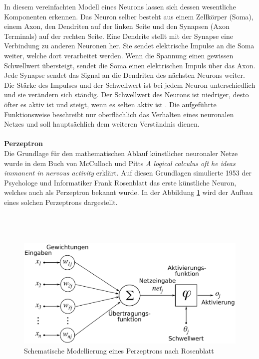 In diesem vereinfachten Modell eines Neurons lassen sich dessen wesentliche Komponenten erkennen. Das Neuron selber besteht aus einem Zellkörper (Soma), einem Axon, den Dendriten auf der linken Seite und den Synapsen (Axon Terminals) auf der rechten Seite. Eine Dendrite stellt mit der Synapse eine Verbindung zu anderen Neuronen her. Sie sendet elektrische Impulse an die Soma weiter, welche dort verarbeitet werden. Wenn die Spannung einen gewissen Schwellwert übersteigt, sendet die Soma einen elektrischen Impuls über das Axon. Jede Synapse sendet das Signal an die Dendriten des nächsten Neurons weiter. Die Stärke des Impulses und der Schwellwert ist bei jedem Neuron unterschiedlich und sie verändern sich ständig. Der Schwellwert des Neurons ist niedriger, desto öfter es aktiv ist und steigt, wenn es selten aktiv ist \cite{schmidt2013physiologie}. Die aufgeführte Funktionsweise beschreibt nur oberflächlich das Verhalten eines neuronalen Netzes und soll hauptsächlich dem weiteren Verständnis dienen.\\\\
\textbf{Perzeptron}\\
Die Grundlage für den mathematischen Ablauf künstlicher neuronaler Netze wurde in dem Buch von McCulloch und Pitts \textit{A logical calculus oft he ideas immanent in nervous activity} erklärt. Auf diesen Grundlagen simulierte 1953 der Psychologe und Informatiker Frank Rosenblatt das erste künstliche Neuron, welches auch als Perzeptron bekannt wurde. In der Abbildung \ref{img:Perzeptron} wird der Aufbau eines solchen Perzeptrons dargestellt.\\\\\\\\
\begin{figure}
	[h]
	\centering
	\includegraphics[scale=0.3]{Sources/perzeptron2.png}
	\caption{Schematische Modellierung eines Perzeptrons nach Rosenblatt \cite{perzeptron2019}}
	\label{img:Perzeptron}
\end{figure}\\
